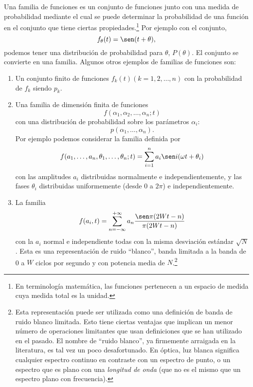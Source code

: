 Una familia de funciones es un conjunto de funciones junto con una
medida de probabilidad mediante el cual se puede determinar la
probabilidad de una funci\'on en el conjunto que tiene ciertas
propiedades.\footnote{En terminolog\'ia matem\'atica, las funciones
pertenecen a un espacio de medida cuya medida total es la unidad.} Por
ejemplo con el conjunto,
\begin{equation}
  f_{\theta}(t) = \sen(t+\theta),
\end{equation}
podemos tener una distribuci\'on de probabilidad para $\theta$, $P(\theta)$.
El conjunto se convierte en una familia. Algunos otros ejemplos de familias de
funciones son:
\begin{enumerate}
  \item Un conjunto finito de funciones $f_k(t)(k=1, 2, \ldots, n)$
  con la probabilidad de $f_k$ siendo $p_k$.

  \item Una familia de dimensi\'on finita de funciones
  \begin{equation}
    f(\alpha_1, \alpha_2, \ldots, \alpha_n; t)
  \end{equation}
  con una distribuci\'on de probabilidad sobre los par\'ametros $\alpha_i$:
  \begin{equation}
    p(\alpha_1, \ldots, \alpha_n).
  \end{equation}
  Por ejemplo podemos considerar la familia definida por
  \begin{equation}
    f(a_1, \ldots, a_n, \theta_1, \ldots, \theta_n; t) = \sum_{i=1}^{n} a_i
    \sen i(\omega t + \theta_i)
  \end{equation}
  con las amplitudes $a_i$ distribuidas normalmente e independientemente,
  y las fases $\theta_i$ distribuidas uniformemente (desde 0 a $2\pi$) e
  independientemente.

  \item La familia
  \begin{equation}
    f(a_i, t) = \sum_{n=-\infty}^{+\infty} a_n \frac{\sen\pi(2Wt-n)}{\pi(2Wt-n)}
  \end{equation}
  con la $a_i$ normal e independiente todas con la misma desviaci\'on
  est\'andar $\sqrt{N}$. Esta es una representaci\'on de ruido ``blanco'',
  banda limitada a la banda de 0 a $W$ ciclos por segundo y con potencia
  media de $N$.\footnote{Esta representaci\'on puede ser utilizada
  como una definici\'on de banda de ruido blanco limitada. Esto tiene
  ciertas ventajas que implican un menor n\'umero de operaciones
  limitantes que usan definiciones que se han utilizado en el
  pasado. El nombre de ``ruido blanco'', ya firmemente arraigada en la
  literatura, es tal vez un poco desafortunado. En \'optica, luz
  blanca significa cualquier espectro continuo en contraste con un
  espectro de punto, o un espectro que es plano con una {\em longitud
  de onda} (que no es el mismo que un espectro plano con frecuencia).}


\end{enumerate}
